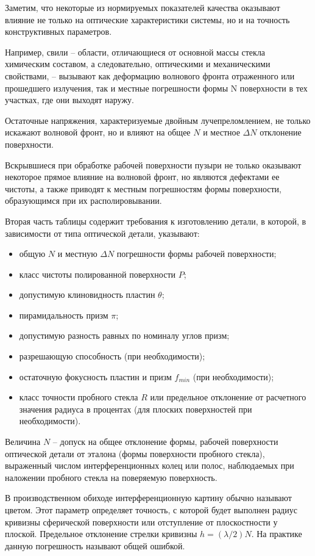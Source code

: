 \begin{enumerate}
	Заметим, что некоторые из нормируемых показателей качества оказывают влияние не только на оптические характеристики системы, но и на точность конструктивных параметров.
	
	Например, свили -- области, отличающиеся от основной массы стекла химическим составом, а следовательно, оптическими и механическими свойствами, -- вызывают как деформацию волнового фронта отраженного или прошедшего излучения, так и местные погрешности формы  N поверхности в тех участках, где они выходят наружу.
	
	Остаточные напряжения, характеризуемые двойным лучепреломлением, не только искажают волновой фронт, но и влияют на общее $N$ и местное  $\Delta N$ отклонение поверхности.
	
	Вскрывшиеся при обработке рабочей поверхности пузыри не только оказывают некоторое прямое влияние на волновой фронт, но являются дефектами ее чистоты, а также приводят к местным погрешностям формы поверхности, образующимся при их располировывании.
	
	Вторая часть таблицы содержит требования к изготовлению детали, в которой, в зависимости от типа оптической детали, указывают:
	\begin{itemize}
		\item общую $N$ и местную $\Delta N$ погрешности формы рабочей поверхности; 
		\item класс чистоты полированной поверхности $P$;
		\item допустимую клиновидность пластин $\theta$;
		\item пирамидальность призм $\pi$;
		\item допустимую разность равных по номиналу углов призм;
		\item разрешающую способность (при необходимости);
		\item остаточную фокусность пластин и призм $f_{min}$ (при необходимости);
		\item класс точности пробного стекла $R$ или предельное отклонение от расчетного значения радиуса в процентах (для плоских поверхностей при необходимости).
	\end{itemize}
	
	Величина $N$ -- допуск на общее отклонение формы, рабочей поверхности оптической детали от эталона (формы поверхности пробного стекла), выраженный числом интерференционных колец или полос, наблюдаемых при наложении пробного стекла на поверяемую поверхность.
	
	В производственном обиходе интерференционную картину обычно называют цветом. Этот параметр определяет точность, с которой будет выполнен радиус кривизны сферической поверхности или отступление от плоскостности у плоской. Предельное отклонение стрелки кривизны  $h = (\lambda/2)N$. На практике данную погрешность называют общей ошибкой.
	

\end{enumerate}
